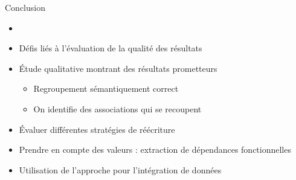 


\begin{frame}{Conclusion}
    \vfill

    \begin{itemize}
        \item 
        \item Défis liés à l'évaluation de la qualité des résultats\vfill
        \item Étude qualitative montrant des résultats prometteurs\vfill
        \begin{itemize}
            \item Regroupement sémantiquement correct
            \item On identifie des associations qui se recoupent
        \end{itemize}
        \vfill\vline\vfill
        \item Évaluer différentes stratégies de réécriture\vfill
        \item Prendre en compte des valeurs : extraction de dépendances fonctionnelles \cite{papenbrockFunctionalDependencyDiscovery2015}
        \item Utilisation de l'approche pour l'intégration de données
    \end{itemize}

    \vfill
\end{frame}
